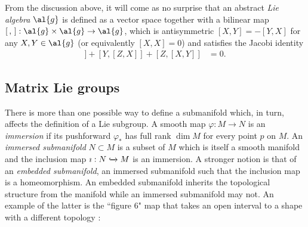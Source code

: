 From the discussion above, it will come as no surprise that an abstract \emph{Lie algebra} $\al{g}$ is defined as a vector space together with a bilinear map $[\, , \, ]: \al{g} \times \al{g} \to \al{g}$, which is antisymmetric $[X,Y] = -[Y,X]$ for any $X,Y \in \al{g}$ (or equivalently $[X,X]=0$) and satisfies the Jacobi identity
\begin{align}
[X,[Y,Z]] + [Y,[Z,X]] + [Z,[X,Y]] &= 0.
\end{align}

\subsection{Matrix Lie groups}\label{ch2:matrix-group}

There is more than one possible way to define a submanifold which, in turn, affects the definition of a Lie subgroup. A smooth map $\varphi:M \to N$ is an \emph{immersion} if its pushforward $\varphi_*$ has full rank $\dim M$ for every point $p$ on $M$. An \emph{immersed submanifold} $N \subset M$ is a subset of $M$ which is itself a smooth manifold and the inclusion map $\imath: N \xhookrightarrow[]{} M$ is an immersion. A stronger notion is that of an \emph{embedded submanifold}, an immersed submanifold such that the inclusion map is a homeomorphism. An embedded submanifold inherits the topological structure from the manifold while an immersed submanifold may not. An example of the latter is the ``figure 6" map that takes an open interval to a shape with a different topology \cite{FH}:


